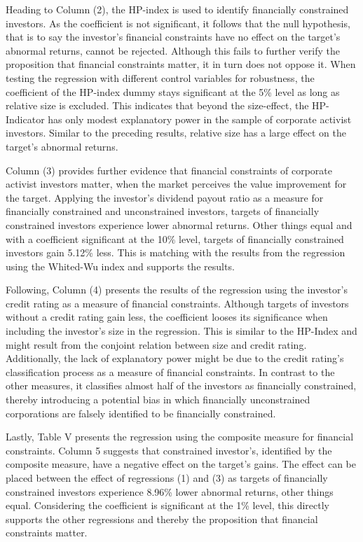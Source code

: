 \documentclass[12pt]{article}
\begin{document}
Heading to Column (2), the HP-index is used to identify financially constrained investors. As the coefficient is not significant, it follows that the null hypothesis, that is to say the investor's financial constraints have no effect on the target's abnormal returns, cannot be rejected. Although this fails to further verify the proposition that financial constraints matter, it in turn does not oppose it. When testing the regression with different control variables for robustness, the coefficient of the HP-index dummy stays significant at the 5\% level as long as relative size is excluded. This indicates that beyond the size-effect, the HP-Indicator has only modest explanatory power in the sample of corporate activist investors. Similar to the preceding results, relative size has a large effect on the target's abnormal returns.\par
Column (3) provides further evidence that financial constraints of corporate activist investors matter, when the market perceives the value improvement for the target. Applying the investor's dividend payout ratio as a measure for financially constrained and unconstrained investors, targets of financially constrained investors experience lower abnormal returns. Other things equal and with a coefficient significant at the 10\% level, targets of financially constrained investors gain 5.12\% less. This is matching with the results from the regression using the Whited-Wu index and supports the results.\par
Following, Column (4) presents the results of the regression using the investor's credit rating as a measure of financial constraints. Although targets of investors without a credit rating gain less, the coefficient looses its significance when including the investor's size in the regression. This is similar to the HP-Index and might result from the conjoint relation between size and credit rating. Additionally, the lack of explanatory power might be due to the credit rating's classification process as a measure of financial constraints. In contrast to the other measures, it classifies almost half of the investors as financially constrained, thereby introducing a potential bias in which financially unconstrained corporations are falsely identified to be financially constrained.\par
Lastly, Table V presents the regression using the composite measure for financial constraints. Column 5 suggests that constrained investor's, identified by the composite measure, have a negative effect on the target's gains. The effect can be placed between the effect of regressions (1) and (3) as targets of financially constrained investors experience 8.96\% lower abnormal returns, other things equal. Considering the coefficient is significant at the 1\% level, this directly supports the other regressions and thereby the proposition that financial constraints matter.\par
\end{document}
